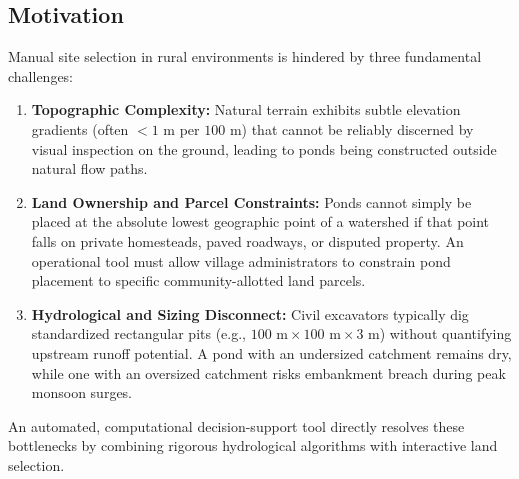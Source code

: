 \documentclass[manuscript,screen]{acmart}
\begin{document}
\subsection{Motivation}
Manual site selection in rural environments is hindered by three fundamental challenges:
\begin{enumerate}
    \item \textbf{Topographic Complexity:} Natural terrain exhibits subtle elevation gradients (often $<1\text{ m}$ per $100\text{ m}$) that cannot be reliably discerned by visual inspection on the ground, leading to ponds being constructed outside natural flow paths.
    \item \textbf{Land Ownership and Parcel Constraints:} Ponds cannot simply be placed at the absolute lowest geographic point of a watershed if that point falls on private homesteads, paved roadways, or disputed property. An operational tool must allow village administrators to constrain pond placement to specific community-allotted land parcels.
    \item \textbf{Hydrological and Sizing Disconnect:} Civil excavators typically dig standardized rectangular pits (e.g., $100\text{ m} \times 100\text{ m} \times 3\text{ m}$) without quantifying upstream runoff potential. A pond with an undersized catchment remains dry, while one with an oversized catchment risks embankment breach during peak monsoon surges.
\end{enumerate}
An automated, computational decision-support tool directly resolves these bottlenecks by combining rigorous hydrological algorithms with interactive land selection.
\end{document}
